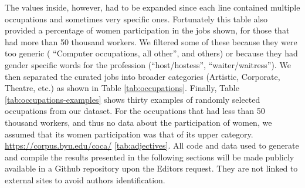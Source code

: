 \documentclass[fleqn,10pt]{article}
\begin{document}
 \citep{BLS2017} The values inside, however, had to be expanded since each line contained multiple occupations and sometimes very specific ones. Fortunately this table also provided a percentage of women participation in the jobs shown, for those that had more than 50 thousand workers. We filtered some of these because they were too generic ( ``Computer occupations, all other'', and others) or because they had gender specific words for the profession (``host/hostess'', ``waiter/waitress''). We then separated the curated jobs into broader categories (Artistic, Corporate, Theatre, etc.) as shown in Table \ref{tab:occupations}. Finally, Table \ref{tab:occupations-examples} shows thirty examples of randomly selected occupations from our dataset. For the occupations that had less than 50 thousand workers, and thus no data about the participation of women, we assumed that its women participation was that of its upper category.  \url{https://corpus.byu.edu/coca/} \ref{tab:adjectives}. All code and data used to generate and{} compile the results presented in the following sections will be made publicly available in a Github repository upon the Editors request. They are not linked to external sites to avoid authors identification. 
\end{document}
